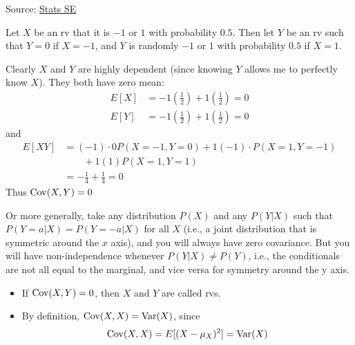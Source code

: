 \documentclass[notoc,notitlepage]{tufte-book}
\begin{document}
\begin{eg}
  Source: \href{https://stats.stackexchange.com/questions/12842/covariance-and-independence\#12844}{Stats SE}

  Let $X$ be an rv that it is $ - 1$ or $1$ with probability $0.5$. Then let $Y$ be an rv such that $Y=0$ if $X=-1$, and $Y$ is randomly $-1$ or $1$ with probability $0.5$ if $X=1$.

  Clearly $X$ and $Y$ are highly dependent (since knowing $Y$ allows me to perfectly know $X$). They both have zero mean: 
  \begin{align*}
    E[X] &= -1 \left(\frac{1}{2}\right) + 1 \left(\frac{1}{2}\right) = 0 \\
    E[Y] &= -1 \left(\frac{1}{2}\right) + 1 \left(\frac{1}{2}\right) = 0
  \end{align*}
  and
  \begin{align*}
    E[ XY ] &= (-1) \cdot 0 P(X = -1, Y = 0) + 1 (-1) \cdot P(X = 1, Y = -1) \\
      &\qquad + 1 (1) P(X = 1, Y = 1) \\
      &= - \frac{1}{4} + \frac{1}{4} = 0
  \end{align*}
  Thus $\operatorname{Cov}(X, Y) = 0$

  Or more generally, take any distribution $P(X)$ and any $P(Y | X)$ such that $P(Y = a | X)=P(Y=-a | X)$ for all $X$ (i.e., a joint distribution that is symmetric around the $x$ axis), and you will always have zero covariance. But you will have non-independence whenever $P(Y | X) \neq P(Y)$, i.e., the conditionals are not all equal to the marginal, and vice versa for symmetry around the y axis. 
\end{eg}

\begin{note}
  \begin{itemize}
    \item If $\operatorname{Cov}(X, Y) = 0$, then $X$ and $Y$ are called  rvs.
    \item By definition, $\operatorname{Cov}(X, X) = \operatorname{Var}(X)$, since
      \begin{equation*}
        \operatorname{Cov}(X, X) = E[ (X - \mu_X)^2 ] = \operatorname{Var}(X)
      \end{equation*}
  \end{itemize}
\end{note}
\end{document}
